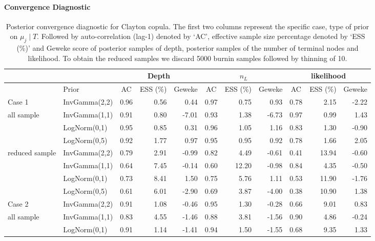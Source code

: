 \documentclass{amsart}
\begin{document}
\paragraph{Convergence Diagnostic}
\begin{table}[ht]
	\centering
	\caption{Posterior convergence diagnostic for Clayton copula. The first two columns represent the specific case, type of prior on $\mu_j\mid T$. Followed by auto-correlation (lag-1) denoted by `AC', effective sample size percentage denoted by `ESS (\%)' and Geweke score of posterior samples of depth, posterior samples of the number of terminal nodes and likelihood. To obtain the reduced samples we discard 5000 burnin samples followed by thinning of 10.}
	\scriptsize{
		\begin{tabular}{ll|crr|crr|crr}
			\toprule
		\multicolumn{2}{c|}{} &
		\multicolumn{3}{c|}{Depth} &
		\multicolumn{3}{c|}{$n_L$} &
		\multicolumn{3}{c}{likelihood} \\
		\midrule
		& Prior & AC & ESS (\%) & Geweke & AC & ESS (\%) & Geweke & AC & ESS (\%) & Geweke \\ 
			\midrule
			Case 1 & InvGamma(2,2) & 0.96 & 0.56 & 0.44 & 0.97 & 0.75 & 0.93 & 0.78 & 2.15 & -2.22 \\ 
			all sample & InvGamma(1,1) & 0.91 & 0.80 & -7.01 & 0.93 & 1.38 & -6.73 & 0.97 & 0.99 & 1.43 \\ 
			& LogNorm(0,1) & 0.95 & 0.85 & 0.31 & 0.96 & 1.05 & 1.16 & 0.83 & 1.30 & -0.90 \\ 
			& LogNorm(0,5) & 0.92 & 1.77 & 0.97 & 0.95 & 0.95 & 0.92 & 0.78 & 1.66 & 2.05 \\ 
			\midrule
			reduced sample & InvGamma(2,2) & 0.79 & 2.91 & -0.99 & 0.82 & 4.49 & -0.61 & 0.41 & 13.94 & -0.60 \\ 
			& InvGamma(1,1) & 0.64 & 7.45 & -0.14 & 0.60 & 12.20 & -0.98 & 0.84 & 4.35 & -0.50 \\ 
			& LogNorm(0,1) & 0.73 & 8.41 & 1.50 & 0.75 & 5.76 & 1.11 & 0.53 & 11.90 & -1.76 \\ 
			& LogNorm(0,5) & 0.61 & 6.01 & -2.90 & 0.69 & 3.87 & -4.00 & 0.38 & 10.90 & 1.38 \\ 
			 \midrule
			Case 2 & InvGamma(2,2) & 0.91 & 1.08 & -0.46 & 0.95 & 1.30 & -0.28 & 0.66 & 9.01 & 0.83 \\ 
			all sample & InvGamma(1,1) & 0.83 & 4.55 & -1.46 & 0.88 & 3.81 & -1.56 & 0.90 & 4.86 & -0.24 \\ 
			& LogNorm(0,1) & 0.91 & 1.14 & -1.41 & 0.94 & 1.50 & -1.55 & 0.68 & 9.35 & 1.33 \\ 

\end{tabular}}
\end{table}
\end{document}
